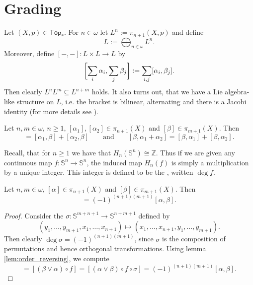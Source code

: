 \section{Grading}
Let $(X,p) \in \mathsf{Top}_\ast$. For $n \in \omega$ let $L^n := \pi_{n + 1}(X,p)$ and define
\begin{equation*}
	L := \bigoplus_{n \in \omega} L^n.
\end{equation*}
Moreover, define $[-,-] : L \times L \to L$ by
\begin{equation*}
	\sbr[3]{\sum_i \alpha_i, \sum_j \beta_j} := \sum_{i,j} [\alpha_i,\beta_j].
\end{equation*}
Then clearly $L^nL^m \subseteq L^{n + m}$ holds. It also turns out, that we have a Lie algebra-like structure on $L$, i.e. the bracket is bilinear, alternating and there is a Jacobi identity (for more details see \cite[474--478]{whitehead:homotopy_theory:1978}). 

\begin{proposition}
	Let $n,m \in \omega$, $n \geq 1$, $[\alpha_1], [\alpha_2] \in \pi_{n + 1}(X)$ and $[\beta] \in \pi_{m + 1}(X)$. Then
	\begin{equation*}
		[\alpha_1 + \alpha_2, \beta] = [\alpha_1,\beta] + [\alpha_2,\beta] \qquad \text{and} \qquad [\beta,\alpha_1 + \alpha_2] = [\beta,\alpha_1] + [\beta,\alpha_2].
	\end{equation*}
\end{proposition}

Recall, that for $n \geq 1$ we have that $H_n(\mathbb{S}^n) \cong \mathbb{Z}$. Thus if we are given any continuous map $f : \mathbb{S}^n \to \mathbb{S}^n$, the induced map $H_n(f)$ is simply a multiplication by a unique integer. This integer is defined to be the , written $\deg f$.

\begin{proposition}
	Let $n,m \in \omega$, $[\alpha] \in \pi_{n + 1}(X)$ and $[\beta] \in \pi_{m + 1}(X)$. Then
	\begin{equation*}
		[\beta,\alpha] = (-1)^{(n + 1)(m + 1)}[\alpha,\beta].
	\end{equation*}
\end{proposition}

\begin{proof}
	Consider the  $\sigma : \mathbb{S}^{m + n + 1} \to \mathbb{S}^{n + m + 1}$ defined by
	\begin{equation*}
		(y_1,\dots,y_{m + 1},x_1,\dots,x_{n + 1}) \mapsto (x_1, \dots,x_{n + 1},y_1,\dots,y_{m + 1}).
	\end{equation*}
	Then clearly $\deg \sigma = (-1)^{(n + 1)(m + 1)}$, since $\sigma$ is the composition of permutations and hence orthogonal transformations. Using lemma \ref{lem:order_reversing}, we compute
	\begin{equation*}
		[\beta,\alpha] = [(\beta \vee \alpha) \circ f] = [(\alpha \vee \beta) \circ f \circ \sigma] = (-1)^{(n + 1)(m + 1)}[\alpha,\beta].
	\end{equation*}
\end{proof}

